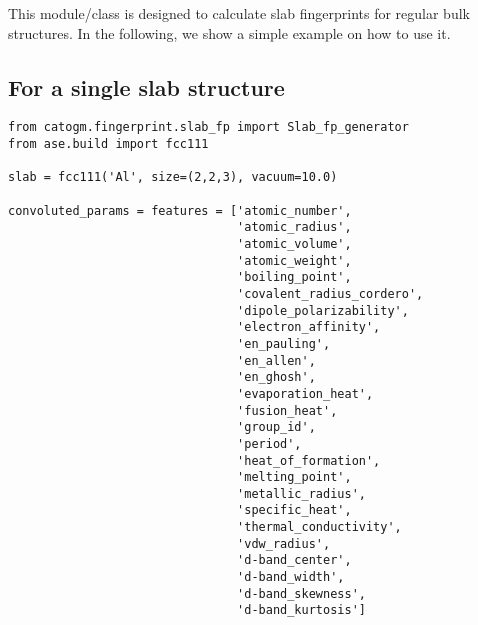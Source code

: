 \documentclass[11pt]{article}
\begin{document}
This module/class is designed to calculate slab fingerprints for regular bulk structures. In the following, we show a simple example on how to use it.

\subsection{For a single slab structure}
\label{sec:orgfacce2d}

\begin{verbatim}
from catogm.fingerprint.slab_fp import Slab_fp_generator
from ase.build import fcc111

slab = fcc111('Al', size=(2,2,3), vacuum=10.0)

convoluted_params = features = ['atomic_number',                                            
                                'atomic_radius',                                            
                                'atomic_volume',                                            
                                'atomic_weight',                                            
                                'boiling_point',                                            
                                'covalent_radius_cordero',                                  
                                'dipole_polarizability',                                    
                                'electron_affinity',                                        
                                'en_pauling',                                               
                                'en_allen',                                                 
                                'en_ghosh',                                                 
                                'evaporation_heat',                                         
                                'fusion_heat',                                              
                                'group_id',                                                 
                                'period',                                                   
                                'heat_of_formation',                                        
                                'melting_point',                                            
                                'metallic_radius',                                          
                                'specific_heat',                                            
                                'thermal_conductivity',                                     
                                'vdw_radius',                                               
                                'd-band_center',                                            
                                'd-band_width',                                             
                                'd-band_skewness',                                          
                                'd-band_kurtosis']     



\end{verbatim}
\end{document}
